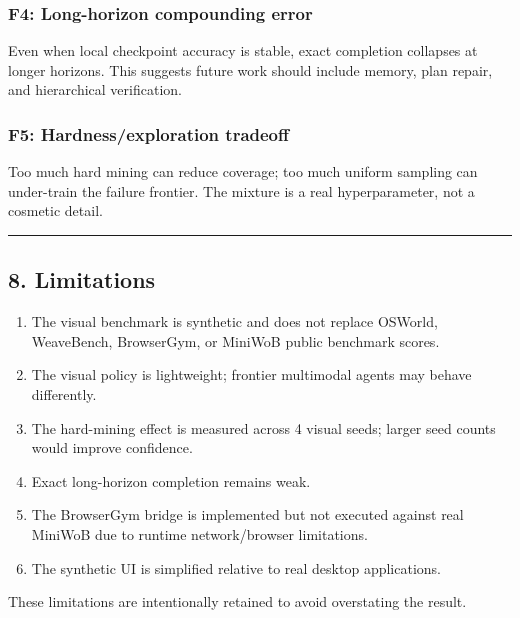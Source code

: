 \documentclass[
]{article}
\providecommand{\tightlist}{%
  \setlength{\itemsep}{0pt}\setlength{\parskip}{0pt}}
\begin{document}
\subsubsection{F4: Long-horizon compounding
error}\label{f4-long-horizon-compounding-error}

Even when local checkpoint accuracy is stable, exact completion
collapses at longer horizons. This suggests future work should include
memory, plan repair, and hierarchical verification.

\subsubsection{F5: Hardness/exploration
tradeoff}\label{f5-hardnessexploration-tradeoff}

Too much hard mining can reduce coverage; too much uniform sampling can
under-train the failure frontier. The mixture is a real hyperparameter,
not a cosmetic detail.

\begin{center}\rule{0.5\linewidth}{0.5pt}\end{center}

\subsection{8. Limitations}\label{limitations}

\begin{enumerate}
\def\labelenumi{\arabic{enumi}.}
\tightlist
\item
  The visual benchmark is synthetic and does not replace OSWorld,
  WeaveBench, BrowserGym, or MiniWoB public benchmark scores.
\item
  The visual policy is lightweight; frontier multimodal agents may
  behave differently.
\item
  The hard-mining effect is measured across 4 visual seeds; larger seed
  counts would improve confidence.
\item
  Exact long-horizon completion remains weak.
\item
  The BrowserGym bridge is implemented but not executed against real
  MiniWoB due to runtime network/browser limitations.
\item
  The synthetic UI is simplified relative to real desktop applications.
\end{enumerate}

These limitations are intentionally retained to avoid overstating the
result.
\end{document}
